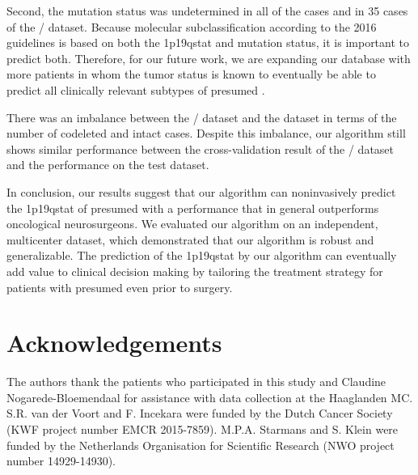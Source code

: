 Second, the  mutation status was undetermined in all of the  cases and in 35 cases of the / dataset.
Because molecular subclassification according to the  2016 guidelines is based on both the \acl{1p19qstat} and  mutation status, it is important to predict both.
Therefore, for our future work, we are expanding our database with more patients in whom the \gls{tumor}  status is known to eventually be able to predict all clinically relevant subtypes of presumed .

There was an imbalance between the / dataset and the  dataset in terms of the number of codeleted and intact cases.
Despite this imbalance, our algorithm still shows similar performance between the cross-validation result of the / dataset and the performance on the  test dataset.

In conclusion, our results suggest that our algorithm can noninvasively predict the \acl{1p19qstat} of presumed  with a performance that in general outperforms oncological neurosurgeons.
We evaluated our algorithm on an independent, multicenter dataset, which demonstrated that our algorithm is robust and generalizable.
The prediction of the \acl{1p19qstat} by our algorithm can eventually add value to clinical decision making by tailoring the treatment strategy for patients with presumed  even prior to surgery.

\section*{Acknowledgements}

The authors thank the patients who participated in this study and Claudine Nogarede-Bloemendaal for assistance with data collection at the Haaglanden MC\@.
S.R. van der Voort and F. Incekara were funded by the Dutch Cancer Society (KWF project number EMCR 2015-7859).
M.P.A. Starmans and S. Klein were funded by the Netherlands Organisation for Scientific Research (NWO project number 14929-14930).

